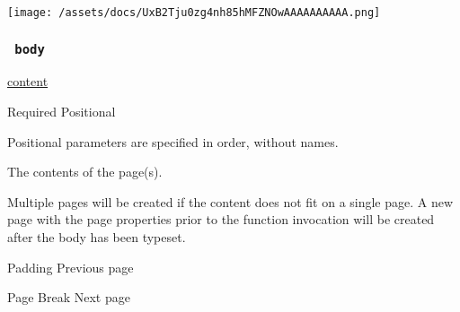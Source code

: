 \texttt{[image: /assets/docs/UxB2Tju0zg4nh85hMFZNOwAAAAAAAAAA.png]}

\subsubsection{\texorpdfstring{\texttt{\ body\ }}{ body }}\label{parameters-body}

\href{/docs/reference/foundations/content/}{content}

{Required} {{ Positional }}

\label{parameters-body-positional-tooltip}
Positional parameters are specified in order, without names.

The contents of the page(s).

Multiple pages will be created if the content does not fit on a single
page. A new page with the page properties prior to the function
invocation will be created after the body has been typeset.

\href{/docs/reference/layout/pad/}{\pandocbounded{}}

{ Padding } { Previous page }

\href{/docs/reference/layout/pagebreak/}{\pandocbounded{}}

{ Page Break } { Next page }
